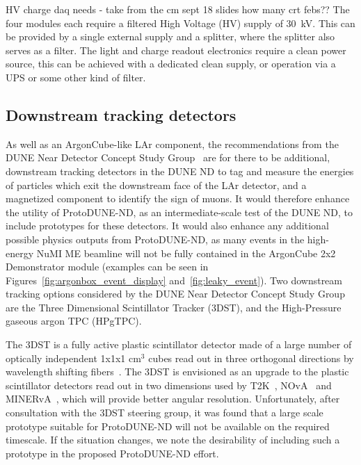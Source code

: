 HV
charge daq needs - take from the cm sept 18 slides  
how many crt febs??
The four modules each require a filtered High Voltage (HV) supply of \SI{30}{\kilo\volt}. This can be provided by a single external supply and a splitter, where the splitter also serves as a filter.
The light and charge readout electronics require a clean power source, this can be achieved with a dedicated clean supply, or operation via a UPS or some other kind of filter. 




\subsection{Downstream tracking detectors}
\label{sec:tracking_detectors}
As well as an ArgonCube-like LAr component, the recommendations from the DUNE Near Detector Concept Study Group~\cite{dune_ndcsg} are for there to be additional, downstream tracking detectors in the DUNE ND to tag and measure the energies of particles which exit the downstream face of the LAr detector, and a magnetized component to identify the sign of muons. It would therefore enhance the utility of ProtoDUNE-ND, as an intermediate-scale test of the DUNE ND, to include prototypes for these detectors. It would also enhance any additional possible physics outputs from ProtoDUNE-ND, as many events in the high-energy NuMI ME beamline will not be fully contained in the ArgonCube 2x2 Demonstrator module (examples can be seen in Figures~\ref{fig:argonbox_event_display} and~\ref{fig:leaky_event}). Two downstream tracking options considered  by the DUNE Near Detector Concept Study Group are the Three Dimensional Scintillator Tracker (3DST), and the High-Pressure gaseous argon TPC (HPgTPC).

The 3DST is a fully active plastic scintillator detector made of a large number of optically independent 1x1x1 cm$^{3}$ cubes read out in three orthogonal directions by wavelength shifting fibers~\cite{3dst}. The 3DST is envisioned as an upgrade to the plastic scintillator detectors read out in two dimensions used by T2K~\cite{t2k-fgd,t2k-ingrid}, NOvA~\cite{nova} and MINERvA~\cite{minerva-nim}, which will provide better angular resolution. Unfortunately, after consultation with the 3DST steering group, it was found that a large scale prototype suitable for ProtoDUNE-ND will not be available on the required timescale. If the situation changes, we note the desirability of including such a prototype in the proposed ProtoDUNE-ND effort.

